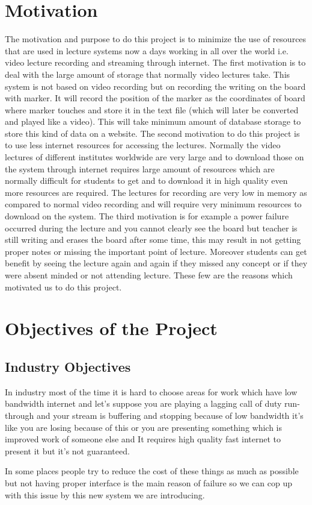 \section{Motivation}
The motivation and purpose to do this project is to minimize the use of resources that are used in lecture systems now a days working in all over the world i.e. video lecture recording and streaming through internet. The first motivation is to deal with the large amount of storage that normally video lectures take. This system is not based on video recording but on recording the writing on the board with marker. It will record the position of the marker as the coordinates of board where marker touches and store it in the text file (which will later be converted and played like a video). This will take minimum amount of database storage to store this kind of data on a website. The second motivation to do this project is to use less internet resources for accessing the lectures. Normally the video lectures of different institutes worldwide are very large and to download those on the system through internet requires large amount of resources which are normally difficult for students to get and to download it in high quality even more resources are required. The lectures for recording are very low in memory as compared to normal video recording and will require very minimum resources to download on the system. The third motivation is for example a power failure occurred during the lecture and you cannot clearly see the board but teacher is still writing and erases the board after some time, this may result in not getting proper notes or missing the important point of lecture. Moreover students can get benefit by seeing the lecture again and again if they missed any concept or if they were absent minded or not attending lecture. These few are the reasons which motivated us to do this project.

\bigskip
\section{Objectives of the Project}
\bigskip
\subsection{Industry Objectives}
In industry most of the time it is hard to choose areas for work which have low bandwidth internet and let's suppose you are playing a lagging call of duty run-through and your stream is buffering and stopping because of low bandwidth it's like you are losing because of this or you are presenting something which is improved work of someone else and It requires high quality fast internet to present it but it's not guaranteed.
\par In some places people try to reduce the cost of these things as much as possible but not having proper interface is the main reason of failure so we can cop up with this issue by this new system we are introducing.

